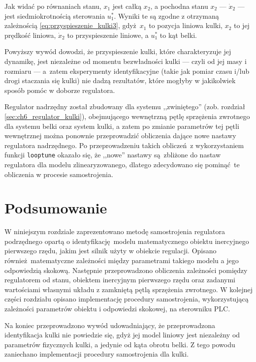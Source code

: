 Jak widać po równaniach stanu, $x_1$ jest całką $x_2$, a pochodna stanu $x_2$ --- $\dot{x}_2$ --- jest siedmiokrotnością sterowania $u_1^*$. Wyniki te są zgodne z otrzymaną zależnością \eqref{eq:przyspieszenie_kulki3}, gdyż $x_1$ to pozycja liniowa kulki, $x_2$ to jej prędkość liniowa, $\dot{x}_2$ to przyspieszenie liniowe, a $u_1^*$ to kąt belki.

Powyższy wywód dowodzi, że przyspieszenie kulki, które charakteryzuje jej dynamikę, jest niezależne od momentu bezwładności kulki --- czyli od jej masy i rozmiaru --- a~zatem eksperymenty identyfikacyjne (takie jak pomiar czasu i/lub drogi staczania się kulki) nie dadzą rezultatów, które mogłyby w jakikolwiek sposób pomóc w doborze regulatora.

Regulator nadrzędny został zbudowany dla systemu ,,zwiniętego'' (zob. rozdział \ref{sec:ch6_regulator_kulki}), obejmującego wewnętrzną pętlę sprzężenia zwrotnego dla systemu belki oraz system kulki, a zatem po zmianie parametrów tej pętli wewnętrznej można ponownie przeprowadzić obliczenia dające nowe nastawy regulatora nadrzędnego. Po przeprowadzeniu takich obliczeń z wykorzystaniem funkcji \texttt{looptune} okazało się, że ,,nowe'' nastawy są zbliżone do nastaw regulatora dla modelu zlinearyzowanego, dlatego zdecydowano się pominąć te obliczenia w procesie samostrojenia.

\section{Podsumowanie}

W niniejszym rozdziale zaprezentowano metodę samostrojenia regulatora podrzędnego opartą o identyfikację modelu matematycznego obiektu inercyjnego pierwszego rzędu, jakim jest silnik użyty w obiekcie regulacji. Opisano również matematyczne zależności między parametrami takiego modelu a jego odpowiedzią skokową. Następnie przeprowadzono obliczenia zależności pomiędzy regulatorem od stanu, obiektem inercyjnym pierwszego rzędu oraz zadanymi wartościami własnymi układu z zamkniętą pętlą sprzężenia zwrotnego. W kolejnej części rozdziału opisano implementację procedury samostrojenia, wykorzystującą zależności parametrów obiektu i odpowiedzi skokowej, na sterowniku PLC.

Na koniec przeprowadzono wywód udowadniający, że przeprowadzona identyfikacja kulki nie powiedzie się, gdyż jej model liniowy jest niezależny od parametrów fizycznych kulki, a jedynie od kąta obrotu belki. Z tego powodu zaniechano implementacji procedury samostrojenia dla kulki.

